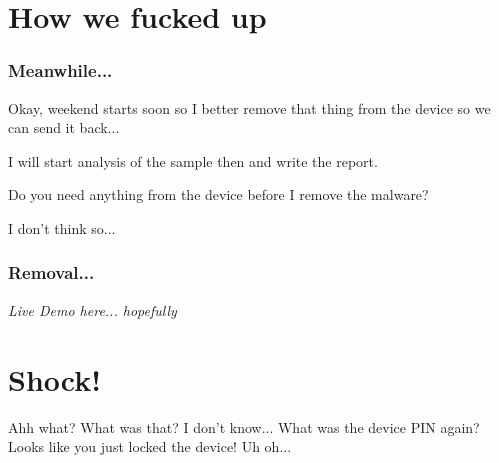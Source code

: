 \documentclass[12pt,a4paper]{beamer}
\newcommand{\mybox}[1]{\par\noindent\colorbox{shadecolor}
{\color{textcolor}\parbox{\dimexpr\textwidth-2\fboxsep\relax}{\fontsize{3em}{3.5em}\selectfont\textbf{{#1}}}}}
\begin{document}
\section{How we fucked up}

\begin{frame}
\frametitle{Meanwhile...}
\begin{dialogue}
 Okay, weekend starts soon so I better remove that thing from the device so we can send it back...

 I will start analysis of the sample then and write the report.

 Do you need anything from the device before I remove the malware?

 I don't think so...
\end{dialogue}
\end{frame}


\begin{frame}
\frametitle{Removal...}
\textit{Live Demo here... hopefully}
\end{frame}




\section{Shock!}
\begin{frame}
	\begin{dialogue}
	 Ahh what?
	 What was that?
	 I don't know... What was the device PIN again? 
	 Looks like you just locked the device!
	 Uh oh...
	\end{dialogue}
\end{frame}

{
\begin{frame}[plain]
\end{frame}
}
\end{document}
